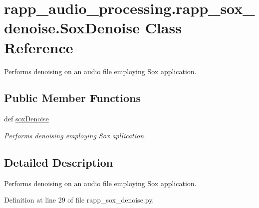 \hypertarget{classrapp__audio__processing_1_1rapp__sox__denoise_1_1SoxDenoise}{\section{rapp\-\_\-audio\-\_\-processing.\-rapp\-\_\-sox\-\_\-denoise.\-Sox\-Denoise Class Reference}
\label{classrapp__audio__processing_1_1rapp__sox__denoise_1_1SoxDenoise}
}


Performs denoising on an audio file employing Sox application.  


\subsection*{Public Member Functions}
\begin{DoxyCompactItemize}
\item 
def \hyperlink{classrapp__audio__processing_1_1rapp__sox__denoise_1_1SoxDenoise_a96c7e0f872235ce4c383ed775b088a9c}{sox\-Denoise}
\begin{DoxyCompactList}\small\item\em Performs denoising employing Sox apllication. \end{DoxyCompactList}\end{DoxyCompactItemize}


\subsection{Detailed Description}
Performs denoising on an audio file employing Sox application. 

Definition at line 29 of file rapp\-\_\-sox\-\_\-denoise.\-py.



